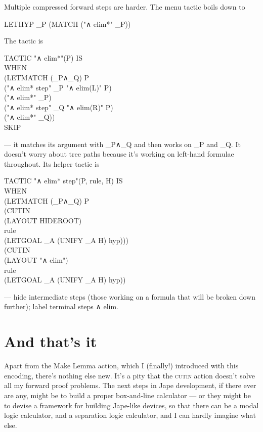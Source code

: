 Multiple compressed forward steps are harder. The menu tactic boils down to
\begin{japeish}
LETHYP \_P  (MATCH ("∧ elim*" \_P))
\end{japeish}
The tactic is 
\begin{japeish}
TACTIC "∧ elim*"(P)  IS \\
\tab WHEN \\
\tab \tab (LETMATCH (\_P∧\_Q)  P \\
\tab \tab \tab ("∧ elim* step" \_P  "∧ elim(L)" P) \\
\tab \tab \tab ("∧ elim*" \_P) \\
\tab \tab \tab ("∧ elim* step" \_Q  "∧ elim(R)" P) \\
\tab \tab \tab ("∧ elim*" \_Q)) \\
\tab \tab SKIP
\end{japeish}
--- it matches its argument with \_P∧\_Q and then works on \_P and \_Q. It doesn't worry about tree paths because it's working on left-hand formulae throughout. Its helper tactic is
\begin{japeish}
TACTIC "∧ elim* step"(P, rule, H) IS \\
\tab WHEN \\
\tab \tab (LETMATCH (\_P∧\_Q)  P \\
\tab \tab \tab (CUTIN \\
\tab \tab \tab \tab (LAYOUT HIDEROOT) \\
\tab \tab \tab \tab rule \\
\tab \tab \tab \tab (LETGOAL \_A (UNIFY \_A H) hyp))) \\
\tab \tab (CUTIN \\
\tab \tab \tab (LAYOUT "∧ elim") \\
\tab \tab \tab rule \\
\tab \tab \tab (LETGOAL \_A (UNIFY \_A H) hyp))
\end{japeish}
--- hide intermediate steps (those working on a formula that will be broken down further); label terminal steps ∧ elim.

\section{And that's it}

Apart from the Make Lemma action, which I (finally!) introduced with this encoding, there's nothing else new. It's a pity that the \textsc{cutin} action doesn't solve all my forward proof problems. The next steps in Jape development, if there ever are any, might be to build a proper box-and-line calculator --- or they might be to devise a framework for building Jape-like devices, so that there can be a modal logic calculator, and a separation logic calculator, and I can hardly imagine what else.

